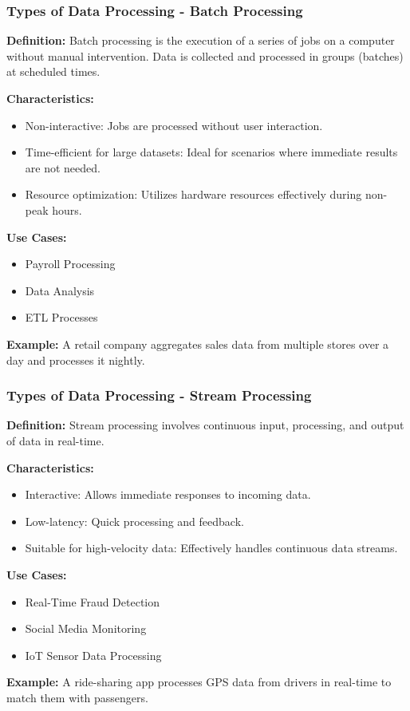 \documentclass{beamer}
\begin{document}
\begin{frame}[fragile]
    \frametitle{Types of Data Processing - Batch Processing}
    \textbf{Definition:} 
    Batch processing is the execution of a series of jobs on a computer without manual intervention. Data is collected and processed in groups (batches) at scheduled times.
    
    \textbf{Characteristics:}
    \begin{itemize}
        \item Non-interactive: Jobs are processed without user interaction.
        \item Time-efficient for large datasets: Ideal for scenarios where immediate results are not needed.
        \item Resource optimization: Utilizes hardware resources effectively during non-peak hours.
    \end{itemize}
    
    \textbf{Use Cases:}
    \begin{itemize}
        \item Payroll Processing
        \item Data Analysis
        \item ETL Processes
    \end{itemize}
    
    \textbf{Example:} 
    A retail company aggregates sales data from multiple stores over a day and processes it nightly.
\end{frame}

\begin{frame}[fragile]
    \frametitle{Types of Data Processing - Stream Processing}
    \textbf{Definition:} 
    Stream processing involves continuous input, processing, and output of data in real-time.
    
    \textbf{Characteristics:}
    \begin{itemize}
        \item Interactive: Allows immediate responses to incoming data.
        \item Low-latency: Quick processing and feedback.
        \item Suitable for high-velocity data: Effectively handles continuous data streams.
    \end{itemize}
    
    \textbf{Use Cases:}
    \begin{itemize}
        \item Real-Time Fraud Detection
        \item Social Media Monitoring
        \item IoT Sensor Data Processing
    \end{itemize}
    
    \textbf{Example:} 
    A ride-sharing app processes GPS data from drivers in real-time to match them with passengers.
\end{frame}
\end{document}
